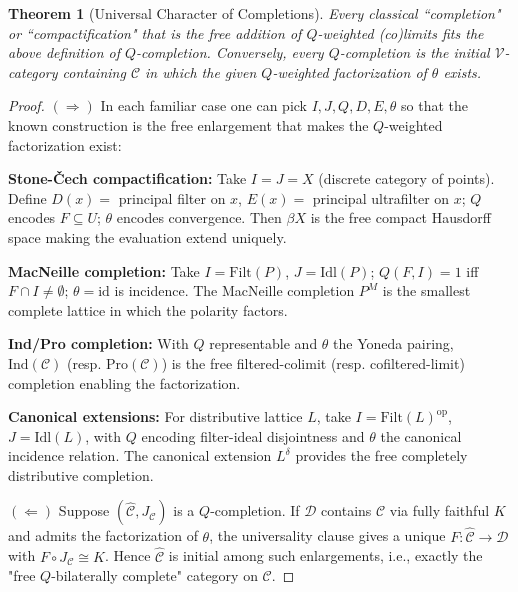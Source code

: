 \documentclass[11pt]{article}
\theoremstyle{plain}
\newtheorem{theorem}{Theorem}[section]
\theoremstyle{definition}
\theoremstyle{remark}
\newcommand{\V}{\mathcal{V}}
\newcommand{\op}{\mathrm{op}}
\begin{document}
\begin{theorem}[Universal Character of Completions]
Every classical ``completion" or ``compactification" that is the free addition of $Q$-weighted (co)limits fits the above definition of $Q$-completion. Conversely, every $Q$-completion is the initial $\V$-category containing $\mathcal{C}$ in which the given $Q$-weighted factorization of $\theta$ exists.
\end{theorem}

\begin{proof}
$(\Rightarrow)$ In each familiar case one can pick $I, J, Q, D, E, \theta$ so that the known construction is the free enlargement that makes the $Q$-weighted factorization exist:

\textbf{Stone-\v{C}ech compactification:} Take $I = J = X$ (discrete category of points). Define $D(x) = $ principal filter on $x$, $E(x) = $ principal ultrafilter on $x$; $Q$ encodes $F \subseteq U$; $\theta$ encodes convergence. Then $\beta X$ is the free compact Hausdorff space making the evaluation extend uniquely.

\textbf{MacNeille completion:} Take $I = \mathrm{Filt}(P)$, $J = \mathrm{Idl}(P)$; $Q(F,I) = 1$ iff $F \cap I \neq \emptyset$; $\theta = \mathrm{id}$ is incidence. The MacNeille completion $P^M$ is the smallest complete lattice in which the polarity factors.

\textbf{Ind/Pro completion:} With $Q$ representable and $\theta$ the Yoneda pairing, $\mathrm{Ind}(\mathcal{C})$ (resp. $\mathrm{Pro}(\mathcal{C})$) is the free filtered-colimit (resp. cofiltered-limit) completion enabling the factorization.

\textbf{Canonical extensions:} For distributive lattice $L$, take $I = \mathrm{Filt}(L)^{\op}$, $J = \mathrm{Idl}(L)$, with $Q$ encoding filter-ideal disjointness and $\theta$ the canonical incidence relation. The canonical extension $L^{\delta}$ provides the free completely distributive completion.

$(\Leftarrow)$ Suppose $(\widehat{\mathcal{C}}, J_{\mathcal{C}})$ is a $Q$-completion. If $\mathcal{D}$ contains $\mathcal{C}$ via fully faithful $K$ and admits the factorization of $\theta$, the universality clause gives a unique $F : \widehat{\mathcal{C}} \to \mathcal{D}$ with $F \circ J_{\mathcal{C}} \cong K$. Hence $\widehat{\mathcal{C}}$ is initial among such enlargements, i.e., exactly the "free $Q$-bilaterally complete" category on $\mathcal{C}$.
\end{proof}
\end{document}
